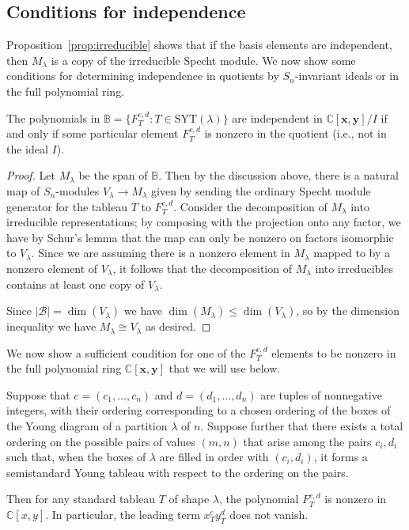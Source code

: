 \documentclass[ALCO,Unicode]{cedram}
\newcommand{\SYT}{\mathrm{SYT}}
\begin{document}
\subsection{Conditions for independence}

Proposition~\ref{prop:irreducible} shows that if the basis elements are independent, then $M_\lambda$ is a copy of the irreducible Specht module.  We now show some conditions for determining independence in quotients by $S_n$-invariant ideals or in the full polynomial ring. 

\begin{prop}\label{prop:nonzero}
	The polynomials in $\mathbb{B}=\{F_T^{c,d}:T\in \SYT(\lambda)\}$ are independent in $\mathbb{C}[\mathbf{x},\mathbf{y}]/I$ if and only if some particular element $F_T^{c,d}$ is nonzero in the quotient (i.e., not in the ideal $I$).  
\end{prop}

\begin{proof}
	Let $M_\lambda$ be the span of $\mathbb{B}$.  Then by the discussion above, there is a natural map of $S_n$-modules $V_\lambda\to M_\lambda$ given by sending the ordinary Specht module generator for the tableau $T$ to $F_T^{c,d}$.  Consider the decomposition of $M_\lambda$ into irreducible representations; by composing with the projection onto any factor, we have by Schur's lemma that the map can only be nonzero on factors isomorphic to $V_\lambda$.  Since we are assuming there is a nonzero element in $M_\lambda$ mapped to by a nonzero element of $V_\lambda$, it follows that the decomposition of $M_\lambda$ into irreducibles contains at least one copy of $V_\lambda$.
	
	Since $|\mathcal{B}|=\dim(V_\lambda)$ we have $\dim(M_\lambda)\le \dim(V_\lambda)$, so by the dimension inequality we have $M_\lambda\cong V_\lambda$ as desired.
\end{proof}

We now show a sufficient condition for one of the $F_T^{c,d}$ elements to be nonzero in the full polynomial ring $\mathbb{C}[\mathbf{x},\mathbf{y}]$ that we will use below.

\begin{prop}\label{prop:SSYT-values}
	Suppose that $c=(c_1,\ldots,c_n)$ and $d=(d_1,\ldots,d_n)$ are tuples of nonnegative integers, with their ordering corresponding to a chosen ordering of the boxes of the Young diagram of a partition $\lambda$ of $n$.  Suppose further that there exists a total ordering on the possible pairs of values $(m,n)$ that arise among the pairs $c_i,d_i$ such that, when the boxes of $\lambda$ are filled in order with $(c_i,d_i)$, it forms a semistandard Young tableau with respect to the ordering on the pairs.
	
	Then for any standard tableau $T$ of shape $\lambda$, the polynomial $F_{T}^{c,d}$ is nonzero in $\mathbb{C}[x,y]$.  In particular, the leading term $x_T^cy_T^d$ does not vanish.
\end{prop}
\end{document}
